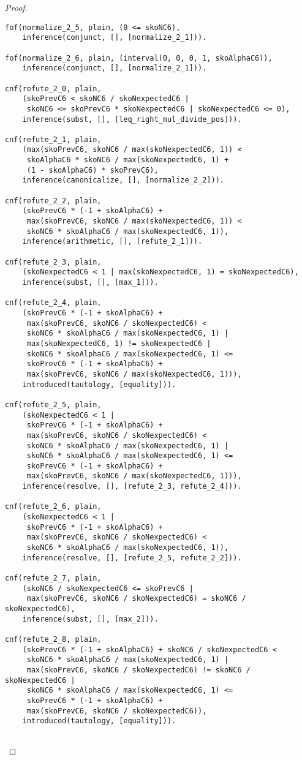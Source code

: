 \begin{proof}
\begin{verbatim}
fof(normalize_2_5, plain, (0 <= skoNC6),
    inference(conjunct, [], [normalize_2_1])).

fof(normalize_2_6, plain, (interval(0, 0, 0, 1, skoAlphaC6)),
    inference(conjunct, [], [normalize_2_1])).

cnf(refute_2_0, plain,
    (skoPrevC6 < skoNC6 / skoNexpectedC6 |
     skoNC6 <= skoPrevC6 * skoNexpectedC6 | skoNexpectedC6 <= 0),
    inference(subst, [], [leq_right_mul_divide_pos])).

cnf(refute_2_1, plain,
    (max(skoPrevC6, skoNC6 / max(skoNexpectedC6, 1)) <
     skoAlphaC6 * skoNC6 / max(skoNexpectedC6, 1) +
     (1 - skoAlphaC6) * skoPrevC6),
    inference(canonicalize, [], [normalize_2_2])).

cnf(refute_2_2, plain,
    (skoPrevC6 * (-1 + skoAlphaC6) +
     max(skoPrevC6, skoNC6 / max(skoNexpectedC6, 1)) <
     skoNC6 * skoAlphaC6 / max(skoNexpectedC6, 1)),
    inference(arithmetic, [], [refute_2_1])).

cnf(refute_2_3, plain,
    (skoNexpectedC6 < 1 | max(skoNexpectedC6, 1) = skoNexpectedC6),
    inference(subst, [], [max_1])).

cnf(refute_2_4, plain,
    (skoPrevC6 * (-1 + skoAlphaC6) +
     max(skoPrevC6, skoNC6 / skoNexpectedC6) <
     skoNC6 * skoAlphaC6 / max(skoNexpectedC6, 1) |
     max(skoNexpectedC6, 1) != skoNexpectedC6 |
     skoNC6 * skoAlphaC6 / max(skoNexpectedC6, 1) <=
     skoPrevC6 * (-1 + skoAlphaC6) +
     max(skoPrevC6, skoNC6 / max(skoNexpectedC6, 1))),
    introduced(tautology, [equality])).

cnf(refute_2_5, plain,
    (skoNexpectedC6 < 1 |
     skoPrevC6 * (-1 + skoAlphaC6) +
     max(skoPrevC6, skoNC6 / skoNexpectedC6) <
     skoNC6 * skoAlphaC6 / max(skoNexpectedC6, 1) |
     skoNC6 * skoAlphaC6 / max(skoNexpectedC6, 1) <=
     skoPrevC6 * (-1 + skoAlphaC6) +
     max(skoPrevC6, skoNC6 / max(skoNexpectedC6, 1))),
    inference(resolve, [], [refute_2_3, refute_2_4])).

cnf(refute_2_6, plain,
    (skoNexpectedC6 < 1 |
     skoPrevC6 * (-1 + skoAlphaC6) +
     max(skoPrevC6, skoNC6 / skoNexpectedC6) <
     skoNC6 * skoAlphaC6 / max(skoNexpectedC6, 1)),
    inference(resolve, [], [refute_2_5, refute_2_2])).

cnf(refute_2_7, plain,
    (skoNC6 / skoNexpectedC6 <= skoPrevC6 |
     max(skoPrevC6, skoNC6 / skoNexpectedC6) = skoNC6 / skoNexpectedC6),
    inference(subst, [], [max_2])).

cnf(refute_2_8, plain,
    (skoPrevC6 * (-1 + skoAlphaC6) + skoNC6 / skoNexpectedC6 <
     skoNC6 * skoAlphaC6 / max(skoNexpectedC6, 1) |
     max(skoPrevC6, skoNC6 / skoNexpectedC6) != skoNC6 / skoNexpectedC6 |
     skoNC6 * skoAlphaC6 / max(skoNexpectedC6, 1) <=
     skoPrevC6 * (-1 + skoAlphaC6) +
     max(skoPrevC6, skoNC6 / skoNexpectedC6)),
    introduced(tautology, [equality])).


\end{verbatim}
\end{proof}

